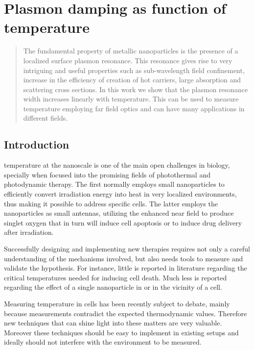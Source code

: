 \chapter{Plasmon damping as function of temperature}
\label{ch:Damping}

\begin{abstract}
The fundamental property of metallic nanoparticles is the presence of a
localized surface plasmon resonance. This resonance gives rise to very
intriguing and useful properties such as sub-wavelength field confinement,
increase in the efficiency of creation of hot carriers, large absorption and
scattering cross sections. In this work we show that the plasmon resonance width
increases linearly with temperature. This can be used to measure temperature
employing far field optics and can have many applications in different fields.
\end{abstract}

\newpage


\section{Introduction}
 temperature at the nanoscale is one of the main open
challenges in biology\cite{Yang2011a}, specially when focused into the promising fields of
photothermal\cite{Huang2006a,Hirsch2003} and photodynamic
therapy\cite{West2003}. The first normally employs small nanoparticles to
efficiently convert irradiation energy into heat in very localized
environments\cite{Ma2014a}, thus making it possible to address specific
cells\cite{Hirsch2003,Huang2008}. The latter employs the nanoparticles as small
antennas, utilizing the enhanced near field to produce singlet oxygen that in
turn will induce cell apoptosis\cite{Hone2002} or to induce drug
delivery after irradiation\cite{Cheng2008}.

Successfully designing and implementing new therapies requires not only a
careful understanding of the mechanisms involved, but also needs tools to
measure and validate the hypothesis. For instance, little is reported in
literature regarding the critical temperatures needed for inducing cell
death\cite{Huang2006a}. Much less is reported regarding the effect of a single
nanoparticle in or in the vicinity of a cell.

Measuring temperature in cells has been recently subject to debate, mainly
because measurements contradict the expected thermodynamic
values\cite{Tanimoto2016,Donner2013,Yang2011a}. Therefore new
techniques that can shine light into these matters are very valuable. Moreover
these techniques should be easy to implement in existing setups and ideally
should not interfere with the environment to be measured.

